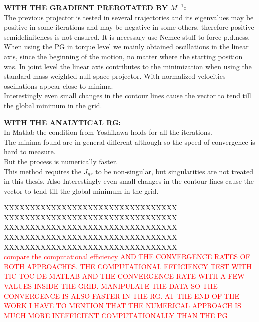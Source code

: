 \textbf{WITH THE GRADIENT PREROTATED BY $M^{-1}$:}  \\
The previous projector is tested in several trajectories and its eigenvalues may be positive in some iterations and may be negative in some others, therefore positive semidefiniteness is not ensured. It is necessary use Nemec stuff to force p.d.ness.\\ When using the PG in torque level we mainly obtained oscillations in the linear axis, since the beginning of the motion, no matter where the starting position was. In joint level the linear axis contributes to the minimization when using the standard mass weighted null space projector. \st{With normalized velocities oscillations appear close to minima.} \\
Interestingly even small changes in the contour lines cause the vector to tend till the global minimum in the grid.

\textbf{WITH THE ANALYTICAL RG:}\\
In Matlab the condition from Yoshikawa holds for all the iterations.  \\
The minima found are in general different although so the speed of convergence is hard to measure.  \\
But the process is numerically faster. \\
This method requires the $J_{nr}$ to be non-singular, but singularities are not treated in this thesis. 
Also Interestingly even small changes in the contour lines cause the vector to tend till the global minimum in the grid.


XXXXXXXXXXXXXXXXXXXXXXXXXXXXXXXXX\\
XXXXXXXXXXXXXXXXXXXXXXXXXXXXXXXXX\\
XXXXXXXXXXXXXXXXXXXXXXXXXXXXXXXXX\\
XXXXXXXXXXXXXXXXXXXXXXXXXXXXXXXXX\\
XXXXXXXXXXXXXXXXXXXXXXXXXXXXXXXXX\\


\textcolor{red}{{compare the computational efficiency AND THE CONVERGENCE RATES OF BOTH APPROACHES. THE COMPUTATIONAL EFFICIENCY TEST WITH TIC-TOC DE MATLAB AND THE CONVERGENCE RATE WITH A FEW VALUES INSIDE THE GRID. MANIPULATE THE DATA SO THE CONVERGENCE IS ALSO FASTER IN THE RG. AT THE END OF THE WORK I HAVE TO MENTION THAT THE NUMERICAL APPROACH IS MUCH MORE INEFFICIENT COMPUTATIONALLY THAN THE PG} }

